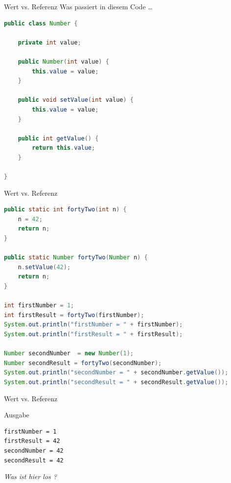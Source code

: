 \documentclass[18pt]{beamer}
\begin{document}
\begin{frame}[fragile]{Wert vs. Referenz}
    Was passiert in diesem Code \dots
    \begin{exampleblock}{}
        \begin{lstlisting}[language=Java,basicstyle=\scriptsize]
public class Number {

    private int value;

    public Number(int value) {
        this.value = value;
    }

    public void setValue(int value) {
        this.value = value;
    }

    public int getValue() {
        return this.value;
    }

}
        \end{lstlisting}
    \end{exampleblock}

\end{frame}

\begin{frame}[fragile]{Wert vs. Referenz}
    \begin{exampleblock}{}
\begin{lstlisting}[language=Java,basicstyle=\scriptsize]
public static int fortyTwo(int n) {
    n = 42;
    return n;
}

public static Number fortyTwo(Number n) {
    n.setValue(42);
    return n;
}

int firstNumber = 1;
int firstResult = fortyTwo(firstNumber);
System.out.println("firstNumber = " + firstNumber);
System.out.println("firstResult = " + firstResult);

Number secondNumber  = new Number(1);
Number secondResult = fortyTwo(secondNumber);
System.out.println("secondNumber = " + secondNumber.getValue());
System.out.println("secondResult = " + secondResult.getValue());
        \end{lstlisting}
    \end{exampleblock}

\end{frame}

\begin{frame}[fragile]{Wert vs. Referenz}
    \begin{alertblock}{Ausgabe}
        \begin{lstlisting}
firstNumber = 1
firstResult = 42
secondNumber = 42
secondResult = 42
        \end{lstlisting}
    \end{alertblock}

    \pause
    \vspace{.5in}
    \textit{Was ist hier los ?}

\end{frame}
\end{document}
